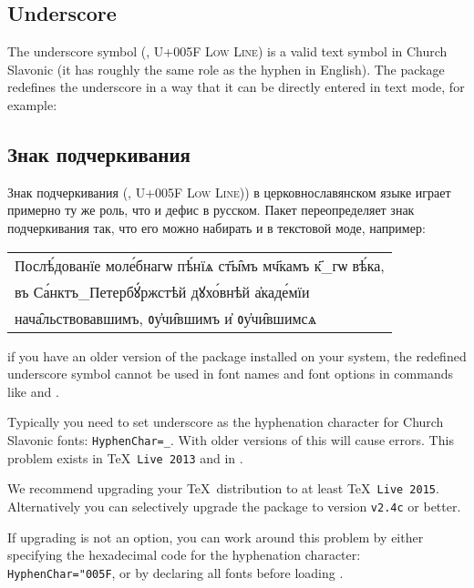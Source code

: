 \begin{EN}
\subsection{Underscore}
The underscore symbol (\texttt{\textunderscore}, U+005F \textsc{Low Line})
 is a valid text symbol in Church Slavonic (it has roughly the same role
as the hyphen in English). The package  redefines the
underscore in a way that it can be directly entered in text mode, for example:
\end{EN}
%
\begin{RU}
\subsection{Знак подчеркивания}
Знак подчеркивания (\texttt{\textunderscore}, U+005F \textsc{Low Line}))
в церковнославянском языке играет примерно ту же роль, что и дефис в русском.
Пакет  переопределяет знак подчеркивания так, что его можно
набирать и в текстовой моде, например:
\end{RU}
%
\begin{center}
\begin{churchslavonic}
\begin{tabular}{l}
Послѣ́дованїе моле́бнагѡ пѣ́нїѧ ст҃ы̑мъ мч҃камъ к҃_гѡ вѣ́ка, \\
въ Са́нктъ_Петербꙋ́ржстѣй дꙋхо́внѣй а҆каде́мїи \\
нача̑льствовавшимъ, ᲂу҆чи̑вшимъ и҆ ᲂу҆чи̑вшимсѧ \\
\end{tabular}
\end{churchslavonic}
\end{center}

\begin{EN}
 if you have an older version of the  package installed on your system,
the redefined underscore symbol cannot be used in font names and font options in  commands like
 and .

Typically you need to set underscore as the hyphenation character for Church Slavonic fonts: \texttt{HyphenChar=_}.
With older versions of  this will cause errors. This problem exists in \TeX\ \texttt{Live 2013} and in .

We recommend upgrading your \TeX\ distribution to at least \TeX\ \texttt{Live 2015}. Alternatively you can selectively
upgrade the  package to version \texttt{v2.4c} or better.

If upgrading is not an option, you can work around this problem by either specifying the hexadecimal code for the hyphenation
character: \texttt{HyphenChar="005F}, or by declaring all fonts before loading .
\end{EN}

